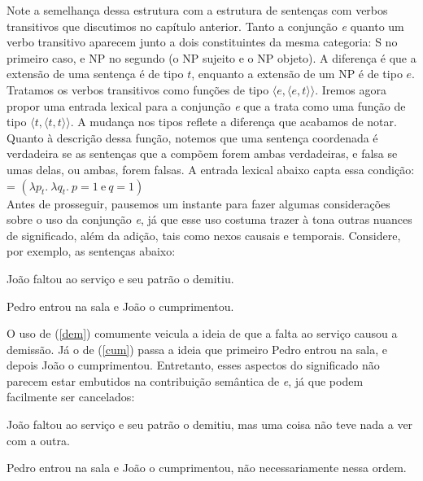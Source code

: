 Note a semelhan\-ça dessa estrutura com a estrutura de senten\-ças
com verbos transitivos que discutimos no capítulo anterior. Tanto
a conjun\-ção \textit{e} quanto um verbo transitivo aparecem junto a dois
constituintes da mesma categoria: S no primeiro caso, e NP no
segundo (o NP sujeito e o NP objeto). A diferen\-ça é que a extensão de uma senten\-ça é de
tipo $t$, enquanto a extensão de um NP é de tipo $e$. Tratamos os
verbos transitivos como fun\-çõ\-es de tipo
$\langle e,\langle e,t \rangle\rangle$. Iremos agora propor uma
entrada lexical para a conjun\-ção  \textit{e} que a trata como uma
fun\-ção de tipo $\langle t,\langle t,t \rangle\rangle$. A
mudan\-ça nos tipos reflete a diferen\-ça que acabamos de notar.
Quanto à descri\-ção dessa fun\-ção, notemos que uma senten\-ça
coordenada é verdadeira se as senten\-ças que a compõem forem
ambas verdadeiras, e falsa se umas delas, ou ambas, forem falsas.
A entrada lexical abaixo capta essa condi\-ção:\\

\n {} = $(\lambda p_{t}.\ \lambda q_{t}.\ p=1\ \text{e}\
q=1)$\\

Antes de prosseguir, pausemos um instante para fazer algumas considerações sobre o uso da conjunção \textit{e}, já que esse uso  costuma trazer à tona outras nuances de significado, além da adição, tais como nexos causais e temporais. Considere, por exemplo, as sentenças abaixo:

\begin{exe}
	\ex João faltou ao serviço e seu patrão o demitiu. \label{dem}
	
	\ex Pedro entrou na sala e João o cumprimentou. \label{cum}	
\end{exe}

\n O uso de (\ref{dem}) comumente veicula a ideia de que a falta ao serviço causou a demissão. Já o de (\ref{cum}) passa a ideia que primeiro Pedro entrou na sala, e depois João o cumprimentou. Entretanto, esses aspectos do significado não parecem estar embutidos na contribuição semântica de \textit{e}, já que podem facilmente ser cancelados:

\begin{exe}
	\ex João faltou ao serviço e seu patrão o demitiu, mas uma coisa não teve nada a ver com a outra. \label{demc}

	\ex Pedro entrou na sala e João o cumprimentou, não necessariamente nessa ordem. \label{cumc}	
\end{exe}

